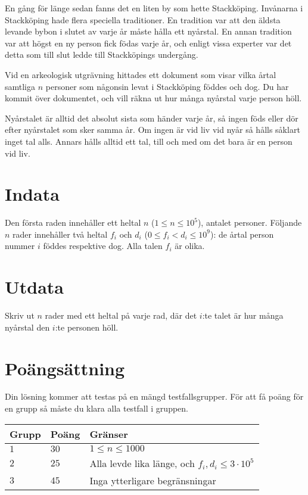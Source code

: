 En gång för länge sedan fanns det en liten by som hette Stackköping.
Invånarna i Stackköping hade flera speciella traditioner.
En tradition var att den äldsta levande bybon i slutet av varje år måste hålla ett nyårstal.
En annan tradition var att högst en ny person fick födas varje år, och enligt vissa experter var det detta som till slut ledde till Stackköpings undergång.

Vid en arkeologisk utgrävning hittades ett dokument som visar vilka årtal samtliga $n$ personer som någonsin levat i Stackköping föddes och dog.
Du har kommit över dokumentet, och vill räkna ut hur många nyårstal varje person höll.

Nyårstalet är alltid det absolut sista som händer varje år, så ingen föds eller dör efter nyårstalet som sker samma år.
Om ingen är vid liv vid nyår så hålls såklart inget tal alls.
Annars hålls alltid ett tal, till och med om det bara är en person vid liv.

\section*{Indata}

Den första raden innehåller ett heltal $n$ ($1 \le n \le 10^5$), antalet personer.
Följande $n$ rader innehåller två heltal $f_i$ och $d_i$ ($0 \le f_i < d_i \le 10^9$): de årtal person nummer $i$ föddes respektive dog.
Alla talen $f_i$ är olika.

\section*{Utdata}
Skriv ut $n$ rader med ett heltal på varje rad, där det $i$:te talet är hur många nyårstal den $i$:te personen höll.

\section*{Poängsättning}
Din lösning kommer att testas på en mängd testfallsgrupper. För att få poäng för en grupp så måste du klara alla testfall i gruppen.

\noindent
\begin{tabular}{| l | l | p{12cm} |}
  \hline
  \textbf{Grupp} & \textbf{Poäng} & \textbf{Gränser} \\ \hline
  $1$    & $30$      & $1 \le n \le 1000$ \\ \hline
  $2$    & $25$      & Alla levde lika länge, och $f_i, d_i \le 3\cdot 10^5$ \\ \hline
  $3$    & $45$      & Inga ytterligare begränsningar  \\ \hline
\end{tabular}

